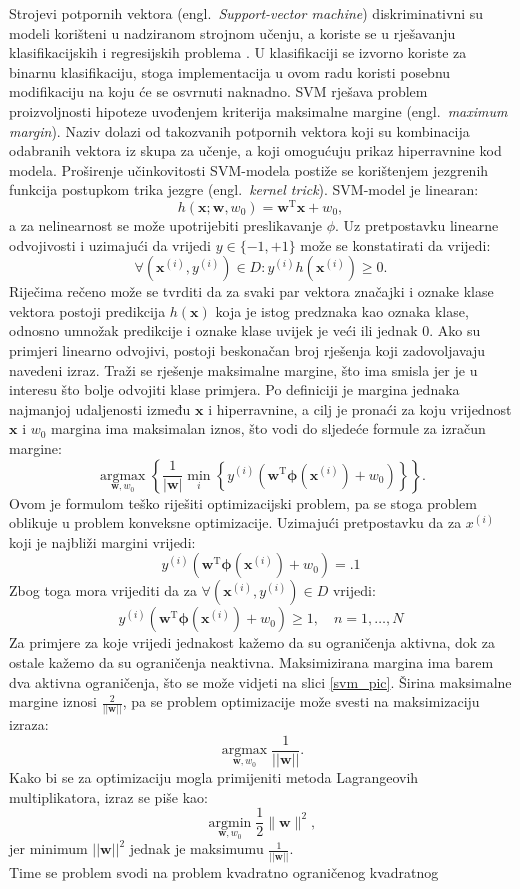 \documentclass[times, utf8, zavrsni]{fer}
\renewcommand{\vec}[1]{\mathbf{#1}}
\begin{document}
Strojevi potpornih vektora (engl.~\emph{Support-vector machine}) diskriminativni su modeli korišteni u nadziranom strojnom učenju, a koriste se u rješavanju klasifikacijskih i regresijskih problema \citep{strojno_skripta}. U klasifikaciji se izvorno koriste za binarnu klasifikaciju, stoga implementacija u ovom radu koristi posebnu modifikaciju na koju će se osvrnuti naknadno. \gls{SVM} rješava problem proizvoljnosti hipoteze uvođenjem kriterija maksimalne margine (engl.~\emph{maximum margin}). Naziv dolazi od takozvanih potpornih vektora koji su kombinacija odabranih vektora iz skupa za učenje, a koji omogućuju prikaz hiperravnine kod modela. Proširenje učinkovitosti \gls{SVM}-modela postiže se korištenjem jezgrenih funkcija postupkom trika jezgre (engl.~\emph{kernel trick}). \gls{SVM}-model je linearan: \[ h(\vec{x;w},w_0)=\vec{w}^\mathrm{T}\vec{x} + w_0, \] a za nelinearnost se može upotrijebiti preslikavanje $\phi$. Uz pretpostavku linearne odvojivosti i uzimajući da vrijedi $y\in\{-1,+1\}$ može se konstatirati da vrijedi: \[ \forall(\vec{x}^{(i)}, y^{(i)})\in D: y^{(i)}h(\vec{x}^{(i)})\ge 0.\] Riječima rečeno može se tvrditi da za svaki par vektora značajki i oznake klase vektora postoji predikcija $h(\vec{x})$ koja je istog predznaka kao oznaka klase, odnosno umnožak predikcije i oznake klase uvijek je veći ili jednak $0$. Ako su primjeri linearno odvojivi, postoji beskonačan broj rješenja koji zadovoljavaju navedeni izraz. Traži se rješenje maksimalne margine, što ima smisla jer je u interesu što bolje odvojiti klase primjera. Po definiciji je margina jednaka najmanjoj udaljenosti između $\vec{x}$ i hiperravnine, a cilj je pronaći za koju vrijednost $\vec{x}$ i $w_0$ margina ima maksimalan iznos, što vodi do sljedeće formule za izračun margine:\[ \underset{\mathbf{w}, w_{0}}{\operatorname{argmax}}\left\{\frac{1}{|\mathbf{w}|} \min _{i}\left\{y^{(i)}\left(\mathbf{w}^{\mathrm{T}} \boldsymbol{\phi}\left(\mathbf{x}^{(i)}\right)+w_{0}\right)\right\}\right\}. \] Ovom je formulom teško riješiti optimizacijski problem, pa se stoga problem oblikuje u problem konveksne optimizacije. Uzimajući pretpostavku da za $x^{(i)}$ koji je najbliži margini vrijedi: \[ y^{(i)}\left(\mathbf{w}^{\mathrm{T}} \boldsymbol{\phi}\left(\mathbf{x}^{(i)}\right)+w_{0}\right)=.1 \] Zbog toga mora vrijediti da za $\forall(\vec{x}^{(i)}, y^{(i)}) \in D$  vrijedi:\[ y^{(i)}\left(\mathbf{w}^{\mathrm{T}} \boldsymbol{\phi}\left(\mathbf{x}^{(i)}\right)+w_{0}\right) \geqslant 1, \quad n=1, \ldots, N \] Za primjere za koje vrijedi jednakost kažemo da su ograničenja aktivna, dok za ostale kažemo da su ograničenja neaktivna. Maksimizirana margina ima barem dva aktivna ograničenja, što se može vidjeti na slici \ref{svm_pic}. Širina maksimalne margine iznosi $\frac{2}{||\vec{w}||}$, pa se problem optimizacije može svesti na maksimizaciju izraza: \[\underset{\vec{w}, w_{0}}{\operatorname{argmax}} \frac{1}{ ||\vec{w}||}. \] Kako bi se za optimizaciju mogla primijeniti metoda Lagrangeovih multiplikatora, izraz se piše kao: \[ \underset{\mathbf{w}, w_{0}}{\operatorname{argmin}} \frac{1}{2}\|\mathbf{w}\|^{2}, \] jer minimum $||\vec{w}||^2$ jednak je maksimumu $\frac{1}{||\vec{w}||}$.\\Time se problem svodi na problem kvadratno ograničenog kvadratnog 
\end{document}
